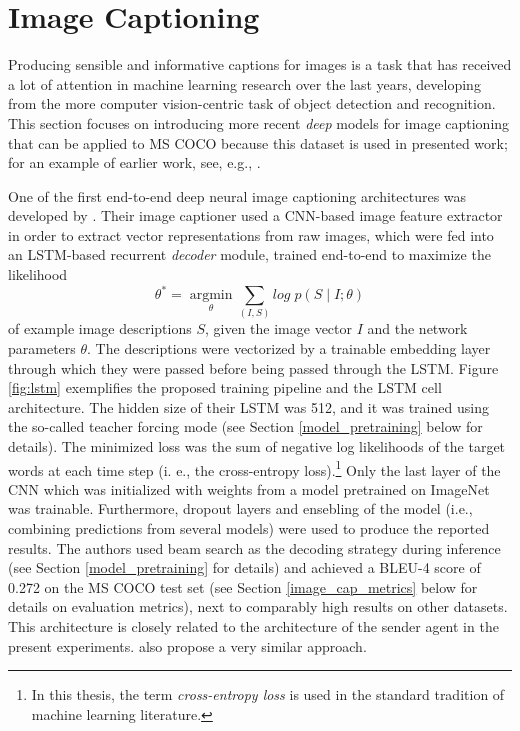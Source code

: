 \section{Image Captioning}
\label{image_captioning}
Producing sensible and informative captions for images is a task that has received a lot of attention in machine learning research over the last years, developing from the more computer vision-centric task of object detection and recognition. 
This section focuses on introducing more recent \textit{deep} models \parencite{lecun2015deep} for image captioning that can be applied to MS COCO because this dataset is used in presented work; for an example of earlier work, see, e.g., \cite{kulkarni2013babytalk}.

One of the first end-to-end deep neural image captioning architectures was developed by \cite{vinyals2015show}. Their image captioner used a CNN-based image feature extractor in order to extract vector representations from raw images, which were fed into an LSTM-based recurrent \textit{decoder} module, trained end-to-end to maximize the likelihood 
\begin{equation}
\theta^* = \operatorname*{argmin}_\theta \sum_{(I, S)} log\; p(S \mid I; \theta) 
\end{equation}
of example image descriptions $S$, given the image vector $I$ and the network parameters $\theta$. The descriptions were vectorized by a trainable embedding layer through which they were passed before being passed through the LSTM. Figure \ref{fig:lstm} exemplifies the proposed training pipeline and the LSTM cell architecture. The hidden size of their LSTM was 512, and it was trained using the so-called teacher forcing mode (see Section \ref{model_pretraining} below for details). The minimized loss was the sum of negative log likelihoods of the target words at each time step (i. e., the cross-entropy loss).\footnote{In this thesis, the term \emph{cross-entropy loss} is used in the standard tradition of machine learning literature.} Only the last layer of the CNN which was initialized with weights from a model pretrained on ImageNet was trainable. Furthermore, dropout layers and ensebling of the model (i.e., combining predictions from several models) were used to produce the reported results. The authors used beam search as the decoding strategy during inference (see Section \ref{model_pretraining} for details) and achieved a BLEU-4 score of 0.272 on the MS COCO test set (see Section \ref{image_cap_metrics} below for details on evaluation metrics), next to comparably high results on other datasets. 
This architecture is closely related to the architecture of the sender agent in the present experiments. \cite{donahue2015long} also propose a very similar approach.

